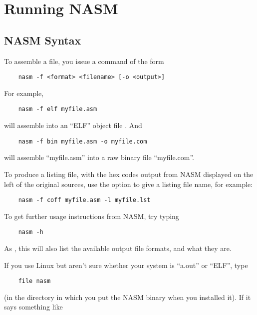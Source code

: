 \chapter{Running NASM}

\section{NASM  Syntax}

To assemble a file, you issue a command of the form

\begin{lstlisting}
	nasm -f <format> <filename> [-o <output>]
\end{lstlisting}

For example,

\begin{lstlisting}
	nasm -f elf myfile.asm
\end{lstlisting}

will assemble  into an ``ELF'' object
file . And

\begin{lstlisting}
	nasm -f bin myfile.asm -o myfile.com
\end{lstlisting}

will assemble ``myfile.asm'' into a raw binary file ``myfile.com''.

To produce a listing file, with the hex codes output from NASM
displayed on the left of the original sources, use the 
option to give a listing file name, for example:

\begin{lstlisting}
	nasm -f coff myfile.asm -l myfile.lst
\end{lstlisting}

To get further usage instructions from NASM, try typing

\begin{lstlisting}
	nasm -h
\end{lstlisting}

As , this will also list the available output file formats,
and what they are.

If you use Linux but aren't sure whether your system is
``a.out'' or ``ELF'', type

\begin{lstlisting}
	file nasm
\end{lstlisting}

(in the directory in which you put the NASM binary when you
installed it). If it says something like

